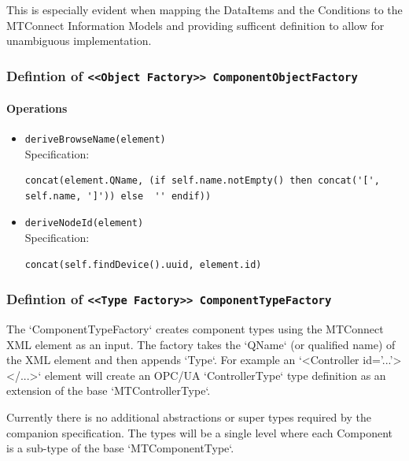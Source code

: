This is especially evident when mapping the DataItems and the Conditions to the 
MTConnect Information Models and providing sufficent definition to allow for 
unambiguous implementation.

\subsubsection{Defintion of \texttt{<<Object Factory>> ComponentObjectFactory}} \label{type:ComponentObjectFactory}

\FloatBarrier



\paragraph{Operations}
\begin{itemize}
  \item \texttt{deriveBrowseName(element)}\\
    Specification:
   \indent \begin{Verbatim}[xleftmargin=.25in,fontsize=\small]
concat(element.QName, (if self.name.notEmpty() then concat('[', self.name, ']')) else  '' endif))
\end{Verbatim}

  \item \texttt{deriveNodeId(element)}\\
    Specification:
   \indent \begin{Verbatim}[xleftmargin=.25in,fontsize=\small]
concat(self.findDevice().uuid, element.id)
\end{Verbatim}

\end{itemize}
\FloatBarrier
\subsubsection{Defintion of \texttt{<<Type Factory>> ComponentTypeFactory}} \label{type:ComponentTypeFactory}

\FloatBarrier

The `ComponentTypeFactory` creates component types using the MTConnect XML element as an input. 
The factory takes the `QName` (or qualified name) of the XML element and then appends `Type`. For 
example an `<Controller id='...'></...>` element will create an OPC/UA `ControllerType` type definition 
as an extension of the base `MTControllerType`. 

Currently there is no additional abstractions or super types required by the companion specification. 
The types will be a single level where each Component is a sub-type of the base `MTComponentType`.


